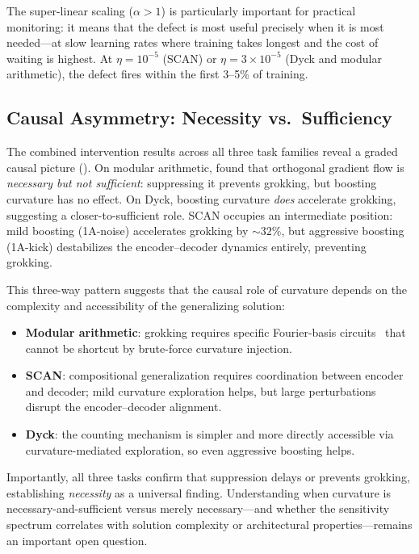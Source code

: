 \documentclass[11pt]{article}
\begin{document}
The super-linear scaling ($\alpha > 1$) is particularly important for practical monitoring: it means that the defect is most useful precisely when it is most needed---at slow learning rates where training takes longest and the cost of waiting is highest. At $\eta = 10^{-5}$ (SCAN) or $\eta = 3 \times 10^{-5}$ (Dyck and modular arithmetic), the defect fires within the first 3--5\% of training.

\subsection{Causal Asymmetry: Necessity vs.\ Sufficiency}

The combined intervention results across all three task families reveal a graded causal picture (). On modular arithmetic, \citet{xu2026integrability} found that orthogonal gradient flow is \emph{necessary but not sufficient}: suppressing it prevents grokking, but boosting curvature has no effect. On Dyck, boosting curvature \emph{does} accelerate grokking, suggesting a closer-to-sufficient role. SCAN occupies an intermediate position: mild boosting (1A-noise) accelerates grokking by ${\sim}32\%$, but aggressive boosting (1A-kick) destabilizes the encoder--decoder dynamics entirely, preventing grokking.

This three-way pattern suggests that the causal role of curvature depends on the complexity and accessibility of the generalizing solution:
\begin{itemize}
  \item \textbf{Modular arithmetic}: grokking requires specific Fourier-basis circuits~\citep{nanda2023progress} that cannot be shortcut by brute-force curvature injection.
  \item \textbf{SCAN}: compositional generalization requires coordination between encoder and decoder; mild curvature exploration helps, but large perturbations disrupt the encoder--decoder alignment.
  \item \textbf{Dyck}: the counting mechanism is simpler and more directly accessible via curvature-mediated exploration, so even aggressive boosting helps.
\end{itemize}

Importantly, all three tasks confirm that suppression delays or prevents grokking, establishing \emph{necessity} as a universal finding. Understanding when curvature is necessary-and-sufficient versus merely necessary---and whether the sensitivity spectrum correlates with solution complexity or architectural properties---remains an important open question.
\end{document}
